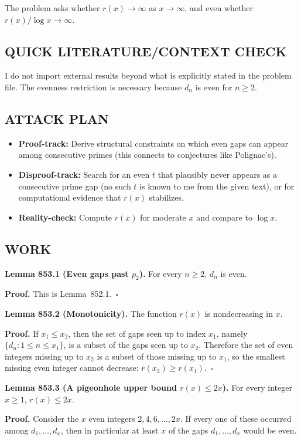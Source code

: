 The problem asks whether $r(x)\to\infty$ as $x\to\infty$, and even whether $r(x)/\log x\to\infty$.

\subsection*{QUICK LITERATURE/CONTEXT CHECK}
I do not import external results beyond what is explicitly stated in the problem file.  The evenness restriction is necessary because $d_n$ is even for $n\ge 2$.

\subsection*{ATTACK PLAN}
\begin{itemize}
\item \textbf{Proof-track:} Derive structural constraints on which even gaps can appear among consecutive primes (this connects to conjectures like Polignac's).
\item \textbf{Disproof-track:} Search for an even $t$ that plausibly never appears as a consecutive prime gap (no such $t$ is known to me from the given text), or for computational evidence that $r(x)$ stabilizes.
\item \textbf{Reality-check:} Compute $r(x)$ for moderate $x$ and compare to $\log x$.
\end{itemize}

\subsection*{WORK}
\textbf{Lemma 853.1 (Even gaps past $p_2$).}
For every $n\ge 2$, $d_n$ is even.

\textbf{Proof.}
This is Lemma~852.1.\ $\square$

\medskip
\textbf{Lemma 853.2 (Monotonicity).}
The function $r(x)$ is nondecreasing in $x$.

\textbf{Proof.}
If $x_1\le x_2$, then the set of gaps seen up to index $x_1$, namely $\{d_n:1\le n\le x_1\}$, is a subset of the gaps seen up to $x_2$. Therefore the set of even integers missing up to $x_2$ is a subset of those missing up to $x_1$, so the smallest missing even integer cannot decrease: $r(x_2)\ge r(x_1)$.\ $\square$

\medskip
\textbf{Lemma 853.3 (A pigeonhole upper bound $r(x)\le 2x$).}
For every integer $x\ge 1$, $r(x)\le 2x$.

\textbf{Proof.}
Consider the $x$ even integers $2,4,6,\dots,2x$. If every one of these occurred among $d_1,\dots,d_x$, then in particular at least $x$ of the gaps $d_1,\dots,d_x$ would be even.

